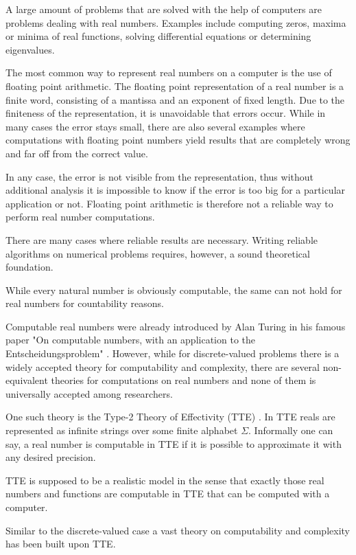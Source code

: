 A large amount of problems that are solved with the help of computers are
problems dealing with real numbers.
Examples include computing zeros, maxima or minima of real functions, solving
differential equations or determining eigenvalues.

The most common way to represent real numbers on a computer is the use of floating point
arithmetic.
The floating point representation of a real number is a finite word, consisting
of a mantissa and an exponent of fixed length.
Due to the finiteness of the representation, it is unavoidable that errors
occur.
While in many cases the error stays small, there are also several examples
where computations with floating point numbers yield results that are
completely wrong and far off from the correct value.

In any case, the error is not visible from the representation, thus without
additional analysis it is impossible to know if the error is too big for a
particular application or not.
Floating point arithmetic is therefore not a reliable way to perform real number
computations.

There are many cases where reliable results are necessary.
Writing reliable algorithms on numerical problems requires, however, a sound
theoretical foundation.

While every natural number is obviously computable, the same can not hold for
real numbers for countability reasons.

Computable real numbers were already introduced by Alan Turing in his famous
paper "On computable numbers, with an application to the Entscheidungsproblem"
\cite{turing36}.
However, while for discrete-valued problems there is a widely accepted theory for
computability and complexity, there are several non-equivalent theories for
computations on real numbers and none of them is universally accepted among
researchers.

One such theory is the Type-2 Theory of Effectivity (TTE) \cite{Wei}.
In TTE reals are represented as infinite strings over some finite alphabet
$\Sigma$.
Informally one can say, a real number is computable in TTE if it is possible to approximate it with any
desired precision.

TTE is supposed to be a realistic model in the sense that exactly those
real numbers and functions are computable in TTE that can be computed with a
computer.

Similar to the discrete-valued case a vast theory on computability and
complexity has been built upon TTE.

